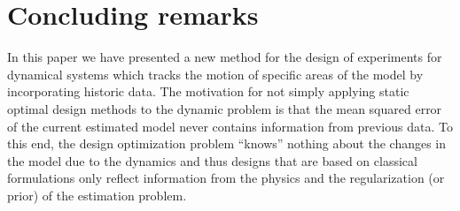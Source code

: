 \documentclass[11pt]{article}
\begin{document}


\section{Concluding remarks}
In this paper we have presented a new method for the design of experiments for dynamical systems which tracks the motion of specific areas of the model by incorporating historic data. 
The motivation for not simply applying static optimal design methods to the dynamic problem is that the mean squared error of the current estimated model never contains information from previous data.
To this end, the design optimization problem ``knows'' nothing about the changes in  the model due to the dynamics and thus designs that are based on classical formulations only reflect information from the physics and the regularization (or prior) of the estimation problem.  
\end{document}
